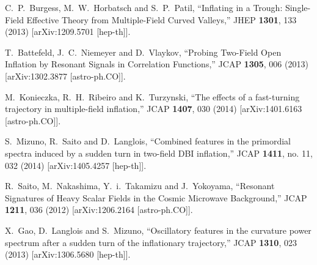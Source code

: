 \documentclass[12pt]{article}
\begin{document}
\begin{thebibliography}{99}
  C.~P.~Burgess, M.~W.~Horbatsch and S.~P.~Patil,
  ``Inflating in a Trough: Single-Field Effective Theory from Multiple-Field Curved Valleys,''
  JHEP {\bf 1301}, 133 (2013)
  [arXiv:1209.5701 [hep-th]].
  
  
  T.~Battefeld, J.~C.~Niemeyer and D.~Vlaykov,
  ``Probing Two-Field Open Inflation by Resonant Signals in Correlation Functions,''
  JCAP {\bf 1305}, 006 (2013)
  [arXiv:1302.3877 [astro-ph.CO]].
  
  M.~Konieczka, R.~H.~Ribeiro and K.~Turzynski,
  ``The effects of a fast-turning trajectory in multiple-field inflation,''
  JCAP {\bf 1407}, 030 (2014)
  [arXiv:1401.6163 [astro-ph.CO]].
  
  S.~Mizuno, R.~Saito and D.~Langlois,
  ``Combined features in the primordial spectra induced by a sudden turn in two-field DBI inflation,''
  JCAP {\bf 1411}, no. 11, 032 (2014)
  [arXiv:1405.4257 [hep-th]].
  
  R.~Saito, M.~Nakashima, Y.~i.~Takamizu and J.~Yokoyama,
  ``Resonant Signatures of Heavy Scalar Fields in the Cosmic Microwave Background,''
  JCAP {\bf 1211}, 036 (2012)
  [arXiv:1206.2164 [astro-ph.CO]].
  
  X.~Gao, D.~Langlois and S.~Mizuno,
  ``Oscillatory features in the curvature power spectrum after a sudden turn of the inflationary trajectory,''
  JCAP {\bf 1310}, 023 (2013)
  [arXiv:1306.5680 [hep-th]].
  

\end{thebibliography}
\end{document}
